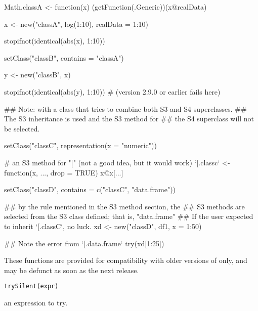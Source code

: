 \begin{Examples}
\begin{ExampleCode}
Math.classA <- function(x) {(getFunction(.Generic))(x@realData)}

x <- new("classA", log(1:10), realData = 1:10)

stopifnot(identical(abs(x), 1:10))

setClass("classB", contains = "classA")

y <- new("classB", x)

stopifnot(identical(abs(y), 1:10)) # (version 2.9.0 or earlier fails here)

## Note: with a class that tries to combine both S3 and S4 superclasses.
## The S3 inheritance is used and the S3 method for
## the S4 superclass will not be selected.

setClass("classC", representation(x = "numeric"))

# an S3 method for "[" (not a good idea, but it would work)
`[.classc` <- function(x, ..., drop = TRUE) {x@x[...]}


setClass("classD", contains = c("classC", "data.frame"))

## by the rule mentioned in the S3 method section, the
## S3 methods are selected from the S3 class defined; that is, "data.frame"
## If the user expected to inherit `[.classC`, no luck.
xd <- new("classD", df1, x = 1:50)

## Note the error from `[.data.frame`
try(xd[1:25])



\end{ExampleCode}
\end{Examples}
%
\begin{Description}\relax
These functions are provided for compatibility with older versions of
\R{} only, and may be defunct as soon as the next release.
\end{Description}
%
\begin{Usage}
\begin{verbatim}
trySilent(expr)
\end{verbatim}
\end{Usage}
%
\begin{Arguments}
\begin{ldescription}
\item[\code{expr}] an \R{} expression to try.
\end{ldescription}
\end{Arguments}
